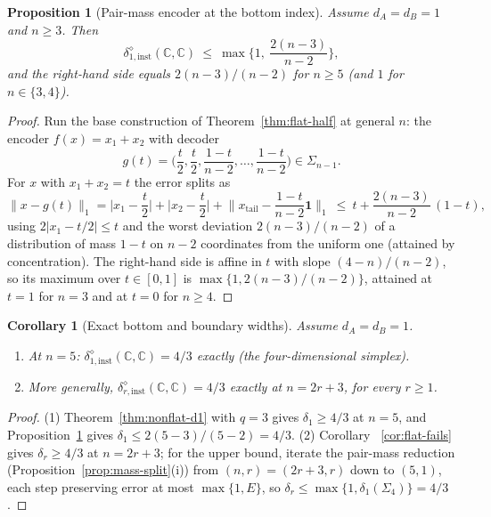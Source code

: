 \documentclass[11pt,a4paper]{article}
\newtheorem{proposition}[theorem]{Proposition}
\newtheorem{corollary}[theorem]{Corollary}
\begin{document}
\begin{proposition}[Pair-mass encoder at the bottom index]
\label{prop:pair-d1}
Assume $d_A=d_B=1$ and $n\ge3$. Then
\[
\delta_{1,\mathrm{inst}}^{\diamond}(\mathbb C,\mathbb C)\ \le\
\max\Big\{1,\ \frac{2(n-3)}{n-2}\Big\},
\]
and the right-hand side equals $2(n-3)/(n-2)$ for $n\ge5$ (and $1$ for $n\in\{3,4\}$).
\end{proposition}

\begin{proof}
Run the base construction of Theorem~\ref{thm:flat-half} at general $n$: the encoder
$f(x)=x_1+x_2$ with decoder
\[
g(t)=\Big(\frac t2,\frac t2,\frac{1-t}{n-2},\dots,\frac{1-t}{n-2}\Big)\in\Sigma_{n-1}.
\]
For $x$ with $x_1+x_2=t$ the error splits as
\[
\|x-g(t)\|_1=\Big|x_1-\frac t2\Big|+\Big|x_2-\frac t2\Big|
+\Big\|x_{\mathrm{tail}}-\frac{1-t}{n-2}\mathbf 1\Big\|_1
\ \le\ t+\frac{2(n-3)}{n-2}\,(1-t),
\]
using $2|x_1-t/2|\le t$ and the worst deviation $2(n-3)/(n-2)$ of a distribution of
mass $1-t$ on $n-2$ coordinates from the uniform one (attained by concentration).
The right-hand side is affine in $t$ with slope $(4-n)/(n-2)$, so its maximum over
$t\in[0,1]$ is $\max\{1,2(n-3)/(n-2)\}$, attained at $t=1$ for $n=3$ and at $t=0$ for
$n\ge4$.
\end{proof}

\begin{corollary}[Exact bottom and boundary widths]
\label{cor:exact-d1}
Assume $d_A=d_B=1$.
\begin{enumerate}[leftmargin=*,itemsep=2pt]
\item At $n=5$: $\delta_{1,\mathrm{inst}}^{\diamond}(\mathbb C,\mathbb C)=4/3$
exactly (the four-dimensional simplex).
\item More generally, $\delta_{r,\mathrm{inst}}^{\diamond}(\mathbb C,\mathbb C)=4/3$
exactly at $n=2r+3$, for every $r\ge1$.
\end{enumerate}
\end{corollary}

\begin{proof}
(1) Theorem~\ref{thm:nonflat-d1} with $q=3$ gives $\delta_1\ge4/3$ at $n=5$, and
Proposition~\ref{prop:pair-d1} gives $\delta_1\le2(5-3)/(5-2)=4/3$. (2) Corollary
~\ref{cor:flat-fails} gives $\delta_r\ge4/3$ at $n=2r+3$; for the upper bound,
iterate the pair-mass reduction (Proposition~\ref{prop:mass-split}(i)) from
$(n,r)=(2r+3,r)$ down to $(5,1)$, each step preserving error at most $\max\{1,E\}$, so
$\delta_r\le\max\{1,\delta_1(\Sigma_4)\}=4/3$.
\end{proof}
\end{document}
